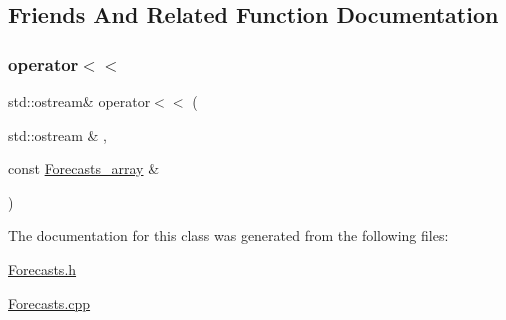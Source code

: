 \subsection{Friends And Related Function Documentation}
\mbox{\label{class_forecasts__array_a6bde933a6e00ad1328f834e4f5d98606}} 
\subsubsection{\texorpdfstring{operator$<$$<$}{operator<<}}
{\footnotesize\ttfamily std\+::ostream\& operator$<$$<$ (\begin{DoxyParamCaption}\item[{std\+::ostream \&}]{,  }\item[{const \mbox{\hyperlink{class_forecasts__array}{Forecasts\+\_\+array}} \&}]{ }\end{DoxyParamCaption})\hspace{0.3cm}{\ttfamily [friend]}}



The documentation for this class was generated from the following files\+:\begin{DoxyCompactItemize}
\item 
\mbox{\hyperlink{_forecasts_8h}{Forecasts.\+h}}\item 
\mbox{\hyperlink{_forecasts_8cpp}{Forecasts.\+cpp}}\end{DoxyCompactItemize}
